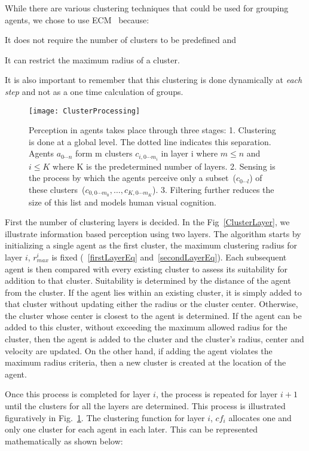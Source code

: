 \documentclass[runningheads,a4paper]{llncs}
\begin{document}
While there are various clustering techniques that could be used for grouping agents, we chose to use ECM~\cite{Song:2001vg} because: 
\begin{inparaenum} 
\item It does not require the number of clusters to be predefined and 
\item It can restrict the maximum radius of a cluster. 
\end{inparaenum}
It is also important to remember that this clustering is done dynamically at \emph{each step} and not as a one time calculation of groups.


\begin{figure}[!tb]
\centering
\texttt{[image: ClusterProcessing]}
\caption{Perception in agents takes place through three stages: 1. Clustering is done at a global level. The dotted line indicates this separation. Agents $a_{0 \cdots n}$ form m clusters $c_{i,{0 \cdots m_{i}}}$ in layer i where $m \leq n$ and  $i \leq K$ where K is the predetermined number of layers. 2. Sensing is the process by which the agents perceive only a subset~($c_{0 \cdots l}$) of these clusters~($c_{0,{0 \cdots m_{0}}}, \ldots , c_{K,{0 \cdots m_{K}}}$). 3. Filtering further reduces the size of this list and models human visual cognition.}
\label{Agent Clustered Perception}
\end{figure}

First the number of clustering layers is decided. In the Fig~\ref{ClusterLayer}, we illustrate information based perception using two layers. The algorithm starts by initializing a single agent as the first cluster, the maximum clustering radius for layer $i$, $r^{i}_{max}$ is fixed (~\ref{firstLayerEq} and~\ref{secondLayerEq}). Each subsequent agent is then compared with every existing cluster to assess its suitability for addition to that cluster. Suitability is determined by the distance of the agent from the cluster. If the agent lies within an existing cluster, it is simply added to that cluster without updating either the radius or the cluster center. Otherwise, the cluster whose center is closest to the agent is determined. If the agent can be added to this cluster, without exceeding the maximum allowed radius for the cluster, then the agent is added to the cluster and the cluster's radius, center and velocity are updated. On the other hand, if adding the agent violates the maximum radius criteria, then a new cluster is created at the location of the agent.

Once this process is completed for layer $i$, the process is repeated for layer $i+1$ until the clusters for all the layers are determined. This process is illustrated figuratively in Fig.~\ref{Agent Clustered Perception}. The clustering function for layer $i$, $cf_{i}$ allocates one and only one cluster for each agent in each later. This can be represented mathematically as shown below:
\end{document}
